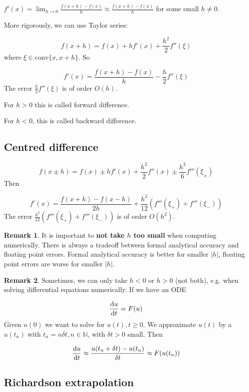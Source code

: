 \documentclass[12pt,a4paper]{article}
\theoremstyle{definition}
\newtheorem*{remark}{Remark}
\begin{document}
$f'(x) = \lim_{h \rightarrow 0} \frac{f(x + h) - f(x)}{h} \approx \frac{f(x + h) - f(x)}{h}$ for some small $h \ne 0$.

More rigorously, we can use Taylor series:

\[ f(x + h) = f(x) + h f'(x) + \frac{h^2}{2} f''(\xi) \]
where $\xi \in \text{conv} \{x, x + h \}$. So

\[ f'(x) = \frac{f(x + h) - f(x)}{h} - \frac{h}{2} f''(\xi) \]
The error $\frac{h}{2} f''(\xi)$ is of order $O(h)$.

For $h > 0$ this is called forward difference.

For $h < 0$, this is called backward difference.

\subsection{Centred difference}

\[ f(x \pm h) = f(x) \pm h f'(x) + \frac{h^2}{2} f''(x) \pm \frac{h^3}{6} f'''(\xi_{\pm}) \]
Then

\[ f'(x) = \frac{f(x + h) - f(x - h)}{2h} + \frac{h^2}{12} \left( f'''(\xi_+) + f'''(\xi_-) \right) \]
The error $\frac{h^2}{12} \left( f'''(\xi_+) + f'''(\xi_-) \right)$ is of order $O(h^2)$.

\begin{remark}
	It is important to \textbf{not take $h$ too small} when computing numerically. There is always a tradeoff between formal analytical accuracy and floating point errors. Formal analytical accuracy is better for smaller $|h|$, floating point errors are worse for smaller $|h|$.
\end{remark}

\begin{remark}
	Sometimes, we can only take $h < 0$ or $h > 0$ (not both), e.g. when solving differential equations numerically. If we have an ODE

	\[ \diff{u}{t} = F(u) \]
	Given $u(0)$ we want to solve for $u(t), t \ge 0$. We approximate $u(t)$ by a $u(t_n)$ with $t_n = n \delta t, n \in \mathbb{N}$, with $\delta t > 0$ small. Then

	\[ \diff{u}{t} \approx \frac{u(t_n + \delta t) - u(t_n)}{\delta t} \approx F(u(t_n)) \]
\end{remark}

\subsection{Richardson extrapolation}
\end{document}
